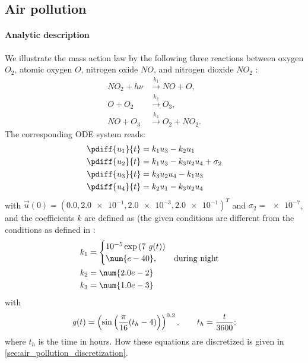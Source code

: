 \subsection{Air pollution}\label{sec:air_pollution}
\paragraph*{Analytic description}
We illustrate the mass action law by the following three reactions between oxygen $O_2$, atomic oxygen $O$, nitrogen oxide $NO$, and nitrogen dioxide $NO_2$ \citep[eq.\ 1.1, page 7]{HundsdorferAndVerwer2003}:
\begin{align}
    NO_2 + h\nu & \xrightarrow{k_1} NO + O, \\
    O + O_2 & \xrightarrow{k_2} O_3, \\
    NO + O_3 & \xrightarrow{k_3} O_2 + NO_2.
\end{align}
The corresponding ODE system reads:
\begin{align}
    \pdiff{u_1}{t} & = k_1 u_3 -k_2 u_1
    \\
    \pdiff{u_2}{t} & = k_1 u_3 - k_3 u_2 u_4 +\sigma_2
    \\
    \pdiff{u_3}{t} & = k_3 u_2 u_4 - k_1 u_3
    \\
    \pdiff{u_4}{t} & = k_2 u_1 - k_3 u_2 u_4
\end{align}
with $\vec{u}(0) = (0.0, \num{2.0e-1}, \num{2.0e-3}, \num{2.0e-1})^T$ and $\sigma_2 = \num{e-7}$, and the coefficients $k$ are defined as (the given conditions are different from the conditions as defined in \citet[pg.\ 8]{HundsdorferAndVerwer2003}:
\begin{align}
    k_1 & = \begin{cases}
        10^{-5} \exp{(7\ {\it g}(t))}
        \\
        \num{e-40}, \qquad \text{during  night}
    \end{cases}
    \\
    k_2 & = \num{2.0e-2}
    \\
    k_3 & = \num{1.0e-3}
\end{align}
with
\begin{align}
    {\it g}(t) =\left(\sin\left(\frac{\pi}{16} (t_h - 4)\right)\right)^{0.2}, \qquad t_h = \frac{t}{3600};
\end{align}
where $t_h$ is the time in hours.
How these equations are discretized is given in \autoref{sec:air_pollution_discretization}.
%
